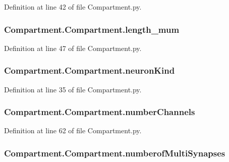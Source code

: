 Definition at line 42 of file Compartment.\-py.

\hypertarget{class_compartment_1_1_compartment_a8154742b0082eea301690e3566e477b6}{
\subsubsection[{length\-\_\-mum}]{\setlength{\rightskip}{0pt plus 5cm}Compartment.\-Compartment.\-length\-\_\-mum}}\label{class_compartment_1_1_compartment_a8154742b0082eea301690e3566e477b6}


Definition at line 47 of file Compartment.\-py.

\hypertarget{class_compartment_1_1_compartment_ad42f32769afd94d1e7d7d54008efb6fa}{
\subsubsection[{neuron\-Kind}]{\setlength{\rightskip}{0pt plus 5cm}Compartment.\-Compartment.\-neuron\-Kind}}\label{class_compartment_1_1_compartment_ad42f32769afd94d1e7d7d54008efb6fa}


Definition at line 35 of file Compartment.\-py.

\hypertarget{class_compartment_1_1_compartment_a0fa96147f76e7814f30610027ed425df}{
\subsubsection[{number\-Channels}]{\setlength{\rightskip}{0pt plus 5cm}Compartment.\-Compartment.\-number\-Channels}}\label{class_compartment_1_1_compartment_a0fa96147f76e7814f30610027ed425df}


Definition at line 62 of file Compartment.\-py.

\hypertarget{class_compartment_1_1_compartment_aed4deea8b0fc160f16ecb1ef39cacba4}{
\subsubsection[{numberof\-Multi\-Synapses}]{\setlength{\rightskip}{0pt plus 5cm}Compartment.\-Compartment.\-numberof\-Multi\-Synapses}}\label{class_compartment_1_1_compartment_aed4deea8b0fc160f16ecb1ef39cacba4}



